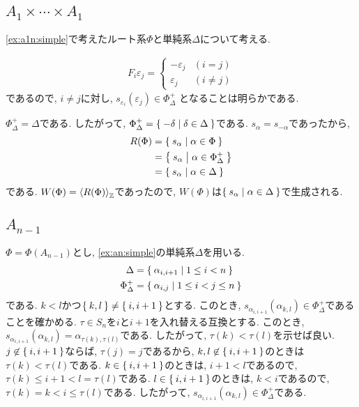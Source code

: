 \subsection{$A_{1}\times\cdots\times A_{1}$}
\cref{ex:a1n:simple}で考えたルート系$\Phi$と単純系$\Delta$について考える.

\begin{align*}
  F_i\varepsilon_j=
  \begin{cases}
    -\varepsilon_j &(i=j)\\
    \varepsilon_j &(i\neq j)
  \end{cases}
\end{align*}
であるので,
$i\neq j$に対し,
$s_{\varepsilon_i}(\varepsilon_j)\in\Phi_\Delta^+$
となることは明らかである.

$\Phi_\Delta^+=\Delta$である.
したがって, $\Phi_\Delta^+=\Set{-\delta|\delta\in\Delta}$である.
$s_\alpha=s_{-\alpha}$であったから,
\begin{align*}
  R(\Phi)
  &=\Set{s_\alpha|\alpha\in\Phi}\\
  &=\Set{s_\alpha|\alpha\in\Phi_\Delta^+}\\
  &=\Set{s_\alpha|\alpha\in\Delta}
\end{align*}
である. $W(\Phi)=\Braket{R(\Phi)}_{\mathbb{Z}}$であったので,
$W(\Phi)$は$\Set{s_\alpha|\alpha\in\Delta}$で生成される.




\subsection{$A_{n-1}$}
\label{ex:an:simplesgens}
$\Phi=\Phi(A_{n-1})$とし,
\cref{ex:an:simple}の単純系$\Delta$を用いる.
\begin{align*}
  \Delta&=\Set{\alpha_{i,i+1}|1\leq i < n}\\
  \Phi_\Delta^+&=\Set{\alpha_{i,j}|1\leq i<j \leq n}\\
\end{align*}
である.
$k<l$かつ$\Set{k,l}\neq \Set{i,i+1}$とする.
このとき,
$s_{\alpha_{i,i+1}}(\alpha_{k,l})\in\Phi_\Delta^+$であることを確かめる.
$\tau\in S_n$を$i$と$i+1$を入れ替える互換とする.
このとき, $s_{\alpha_{i,i+1}}(\alpha_{k,l})=\alpha_{\tau(k),\tau(l)}$である.
したがって, $\tau(k)<\tau(l)$を示せば良い.
$j\not\in\Set{i,i+1}$ならば, $\tau(j)=j$であるから,
$k,l\not\in\Set{i,i+1}$のときは$\tau(k)<\tau(l)$である.
$k\in\Set{i,i+1}$のときは,
$i+1< l$であるので, $\tau(k)\leq i+1<l=\tau(l)$である.
$l\in\Set{i,i+1}$のときは,
$k<i$であるので, $\tau(k)= k<i\leq \tau(l)$である.
したがって,
$s_{\alpha_{i,i+1}}(\alpha_{k,l})\in\Phi_\Delta^+$である.

